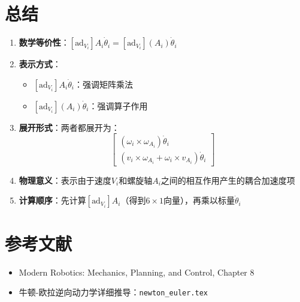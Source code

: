 \documentclass[12pt,a4paper]{article}
\begin{document}
\section{总结}

\begin{enumerate}
\item \textbf{数学等价性}：$[\text{ad}_{V_i}] A_i \dot{\theta}_i = [\text{ad}_{V_i}](A_i) \dot{\theta}_i$

\item \textbf{表示方式}：
\begin{itemize}
\item $[\text{ad}_{V_i}] A_i \dot{\theta}_i$：强调矩阵乘法
\item $[\text{ad}_{V_i}](A_i) \dot{\theta}_i$：强调算子作用
\end{itemize}

\item \textbf{展开形式}：两者都展开为：
\begin{equation}
\begin{bmatrix}
(\omega_i \times \omega_{A_i}) \dot{\theta}_i \\
(v_i \times \omega_{A_i} + \omega_i \times v_{A_i}) \dot{\theta}_i
\end{bmatrix}
\end{equation}

\item \textbf{物理意义}：表示由于速度$V_i$和螺旋轴$A_i$之间的相互作用产生的耦合加速度项

\item \textbf{计算顺序}：先计算$[\text{ad}_{V_i}] A_i$（得到$6 \times 1$向量），再乘以标量$\dot{\theta}_i$
\end{enumerate}

\section{参考文献}

\begin{itemize}
\item Modern Robotics: Mechanics, Planning, and Control, Chapter 8
\item 牛顿-欧拉逆向动力学详细推导：\texttt{newton\_euler.tex}
\end{itemize}
\end{document}
